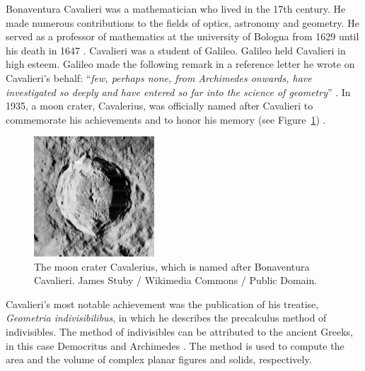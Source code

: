 \documentclass{article}
\theoremstyle{theorem}
\theoremstyle{definition}
\begin{document}
\noindent
Bonaventura Cavalieri was a mathematician who lived in the 17th century. He made numerous contributions to the fields of optics, astronomy and geometry.
He served as a professor of mathematics at the university of Bologna from 1629 until his death in 1647 \cite{andersen1985,eves1991,jullien2015}. 
Cavalieri was a student of Galileo. Galileo held Cavalieri in high esteem. Galileo made the following remark in a reference letter he wrote on Cavalieri's behalf: ``\emph{few, perhaps none, from 
Archimedes onwards, have investigated so deeply and have entered so far into the science of geometry}'' \cite{gonzalez2018}. In 1935, a moon crater, Cavalerius, was officially named after Cavalieri to commemorate his achievements and to honor his memory (see Figure~\ref{fig:crater}) \cite{blagg1935}. 
\begin{figure}[htb]
\centering
\includegraphics[width=0.4\textwidth]{crater.jpg}
\caption{The moon crater Cavalerius, which is named after Bonaventura Cavalieri. James Stuby / Wikimedia Commons / Public Domain.}
\label{fig:crater}
\end{figure}
Cavalieri's most notable achievement was the publication of his 
treatise, \emph{Geometria indivisibilibus}, in which he describes the precalculus method of indivisibles. The method of indivisibles can be attributed to the ancient Greeks,
in this case Democritus and Archimedes \cite{eves1991}. The method is used to compute the area and the volume of complex planar figures and solids, respectively.\\
\end{document}
